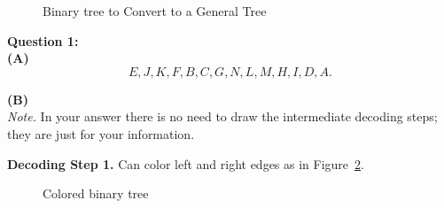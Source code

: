 \documentclass[a4paper,12pt]{article}
\begin{document}
\begin{figure}[!htb]
\caption{\label{fig:binary-tree-problem} Binary tree to Convert to a General Tree}
\end{figure}












\newpage


{\bf Question 1:}\\
{\bf (A)}\\
$$E,J,K,F,B,C,G,N,L,M,H,I,D,A.$$


\vspace{5pt}
{\bf (B)}\\
{\em Note.} In your answer there is no need to draw the intermediate decoding steps; 
they are just for your information. 

\vspace{5pt}
{\bf Decoding Step 1.} Can color left and right edges as 
in Figure~\ref{fig:binary-tree-problem-colored}. 

\begin{figure}[!htb]
\caption{\label{fig:binary-tree-problem-colored} Colored binary tree}
\end{figure}
\end{document}
